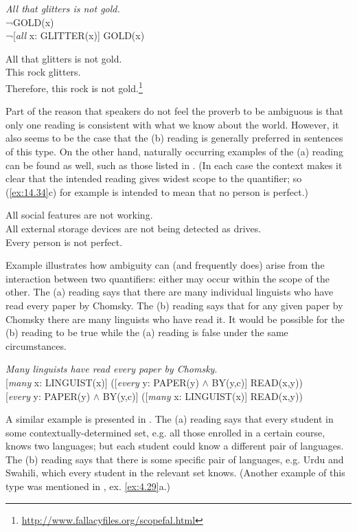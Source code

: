 \ea \label{ex:14.32}
\textit{All that glitters is not gold.}\\
 ¬GOLD(x)\\
\ex  ¬[\textit{all} x: GLITTER(x)] GOLD(x)
                       \z
\z

\ea \label{ex:14.33}
All that glitters is not gold.\\
This rock glitters.\\
Therefore, this rock is not gold.\footnote{\url{http://www.fallacyfiles.org/scopefal.html}}
\z


Part of the reason that speakers do not feel the proverb to be ambiguous is that only one reading is consistent with what we know about the world. However, it also seems to be the case that the (b) reading is generally preferred in sentences of this type. On the other hand, naturally occurring examples of the (a) reading can be found as well, such as those listed in . (In each case the context makes it clear that the intended reading gives widest scope to the quantifier; so (\ref{ex:14.34}c) for example is intended to mean that no person is perfect.)


\ea \label{ex:14.34}
\ea All social features are not working.\\
\ex All external storage devices are not being detected as drives.\\
\ex Every person is not perfect.
                       \z
\z


Example  illustrates how ambiguity can (and frequently does) arise from the interaction between two quantifiers: either may occur within the scope of the other. The (a) reading says that there are many individual linguists who have read every paper by Chomsky. The (b) reading says that for any given paper by Chomsky there are many linguists who have read it. It would be possible for the (b) reading to be true while the (a) reading is false under the same circumstances.


\ea \label{ex:14.35}
\textit{Many linguists have read every paper by Chomsky}.\\
\ea{}  [\textit{many} x: LINGUIST(x)] ([\textit{every} y: PAPER(y) $\wedge$ BY(y,c)] READ(x,y))\\
\ex{}  [\textit{every} y: PAPER(y) $\wedge$ BY(y,c)] ([\textit{many} x: LINGUIST(x)] READ(x,y))
                       \z
\z


A similar example is presented in . The (a) reading says that every student in some contextually-determined set, e.g. all those enrolled in a certain course, knows two languages; but each student could know a different pair of languages. The (b) reading says that there is some specific pair of languages, e.g.  {Urdu} and  {Swahili}, which every student in the relevant set knows. (Another example of this type was mentioned in , ex. \ref{ex:4.29}a.)


